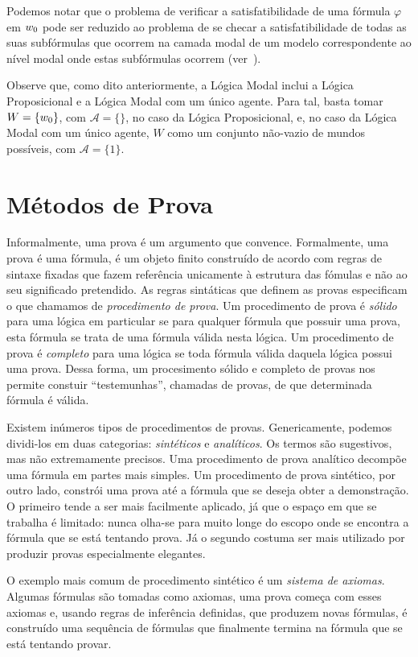 Podemos notar que o problema de verificar a satisfatibilidade de uma fórmula
$\varphi$ em $w_0$ pode ser reduzido ao problema de se checar a
satisfatibilidade de todas as suas subfórmulas que ocorrem na camada modal de um
modelo correspondente ao nível modal onde estas subfórmulas ocorrem
(ver~\cite{Areces00tree-basedheuristics}). 

Observe que, como dito anteriormente, a Lógica Modal  inclui a
Lógica Proposicional e a Lógica Modal com um único agente. Para tal, basta tomar
$W = \{w_0\}$, com $\mathcal{A} = \{\}$, no caso da Lógica Proposicional, e,
no caso da Lógica Modal com um único agente, $W$ como um conjunto não-vazio de
mundos possíveis, com $\mathcal{A} = \{1\}$.

\section{Métodos de Prova}
\label{sec:metodos}
Informalmente, uma prova é um argumento que convence. Formalmente, uma prova é
uma fórmula, é um objeto finito construído de acordo com regras de sintaxe
fixadas que fazem referência unicamente à estrutura das fómulas e não ao seu
significado pretendido. As regras sintáticas que definem as provas especificam o
que chamamos de \textit{procedimento de prova}.
Um procedimento de prova é \textit{sólido} para uma lógica em particular se
para qualquer fórmula que possuir uma prova, esta fórmula se trata de uma
fórmula válida nesta lógica. Um procedimento de prova é \textit{completo} para
uma lógica se toda fórmula válida daquela lógica possui uma prova. Dessa forma,
um procesimento sólido e completo de provas nos permite constuir
``testemunhas'', chamadas de provas, de que determinada fórmula é válida.

Existem inúmeros tipos de procedimentos de provas. Genericamente, podemos
dividi-los em duas categorias: \textit{sintéticos} e \textit{analíticos}. Os
termos são sugestivos, mas não extremamente precisos. Uma procedimento de prova
analítico decompõe uma fórmula em partes mais simples. Um procedimento de prova
sintético, por outro lado, constrói uma prova até a fórmula que se deseja obter a
demonstração.
O primeiro tende a ser mais facilmente aplicado, já que o espaço em que se
trabalha é limitado: nunca olha-se para muito longe do escopo onde se encontra a
fórmula que se está tentando prova. Já o segundo costuma ser mais utilizado por
produzir provas especialmente elegantes.

O exemplo mais comum de procedimento sintético é um \textit{sistema de axiomas}.
Algumas fórmulas são tomadas como axiomas, uma prova começa com esses axiomas e,
usando regras de inferência definidas, que produzem novas fórmulas, é construído
uma sequência de fórmulas que finalmente termina na fórmula que se está tentando
provar.

